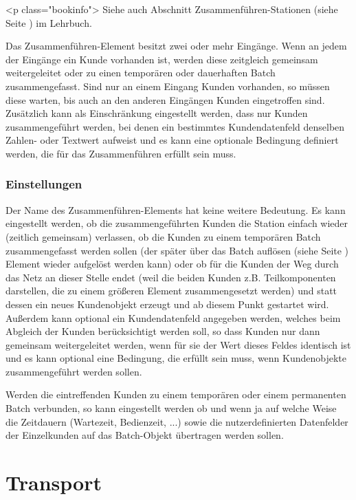 <p class="bookinfo">
Siehe auch Abschnitt Zusammenführen-Stationen (siehe Seite \pageref{ref:book:8.2.8}) im Lehrbuch.

Das Zusammenführen-Element besitzt zwei oder mehr Eingänge. Wenn an jedem der Eingänge ein Kunde vorhanden ist,
werden diese zeitgleich gemeinsam weitergeleitet oder zu einen temporären oder dauerhaften Batch zusammengefasst.
Sind nur an einem Eingang Kunden vorhanden, so müssen diese warten, bis auch an den anderen Eingängen Kunden eingetroffen sind.
Zusätzlich kann als Einschränkung eingestellt werden, dass nur Kunden zusammengeführt werden, bei denen ein bestimmtes
Kundendatenfeld denselben Zahlen- oder Textwert aufweist und es kann eine optionale Bedingung definiert werden,
die für das Zusammenführen erfüllt sein muss.

\subsection*{Einstellungen}

Der Name des Zusammenführen-Elements hat keine weitere Bedeutung. Es kann eingestellt werden, ob die zusammengeführten
Kunden die Station einfach wieder (zeitlich gemeinsam) verlassen, ob die Kunden zu einem temporären
Batch zusammengefasst werden sollen (der später über das Batch auflösen (siehe Seite \pageref{ref:ModelElementSeparate}) Element
wieder aufgelöst werden kann) oder ob für die Kunden der Weg durch das Netz an
dieser Stelle endet (weil die beiden Kunden z.B. Teilkomponenten darstellen, die zu einem größeren Element zusammengesetzt
werden) und statt dessen ein neues Kundenobjekt erzeugt und ab diesem Punkt gestartet wird.
Außerdem kann optional ein Kundendatenfeld angegeben werden, welches beim Abgleich der Kunden berücksichtigt werden soll,
so dass Kunden nur dann gemeinsam weitergeleitet werden, wenn für sie der Wert dieses Feldes identisch ist und es kann
optional eine Bedingung, die erfüllt sein muss, wenn Kundenobjekte zusammengeführt werden sollen.

Werden die eintreffenden Kunden zu einem temporären oder einem permanenten Batch verbunden, so kann eingestellt werden
ob und wenn ja auf welche Weise die Zeitdauern (Wartezeit, Bedienzeit, ...) sowie die nutzerdefinierten Datenfelder
der Einzelkunden auf das Batch-Objekt übertragen werden sollen.





\chapter{Transport}

